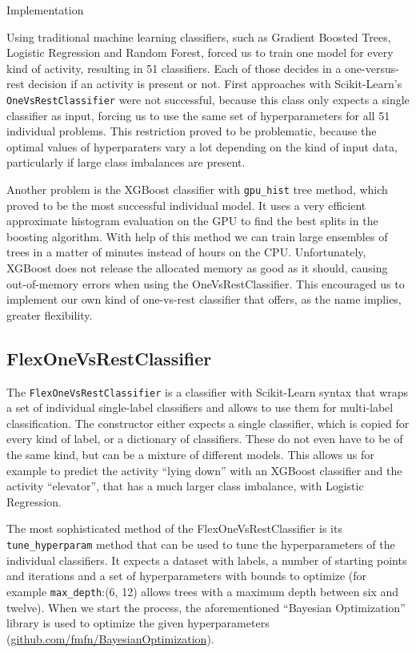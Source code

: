 \begin{section}{Implementation}



Using traditional machine learning classifiers, such as Gradient Boosted Trees, Logistic Regression and Random Forest, forced us to train one model for every kind of activity, resulting in 51 classifiers. Each of those decides in a one-versus-rest decision if an activity is present or not. 
First approaches with Scikit-Learn's \texttt{OneVsRestClassifier} were not successful, because this class only expects a single classifier as input, forcing us to use the same set of hyperparameters for all 51 individual problems. This restriction proved to be problematic, because the optimal values of hyperparaters vary a lot depending on the kind of input data, particularly if large class imbalances are present.

Another problem is the XGBoost classifier with \texttt{gpu\_hist} tree method, which proved to be the most successful individual model. It uses a very efficient approximate histogram evaluation on the GPU to find the best splits in the boosting algorithm. With help of this method we can train large ensembles of trees in a matter of minutes instead of hours on the CPU. Unfortunately, XGBoost does not release the allocated memory as good as it should, causing out-of-memory errors when using the OneVsRestClassifier.
This encouraged us to implement our own kind of one-vs-rest classifier that offers, as the name implies, greater flexibility. 

\subsection{FlexOneVsRestClassifier}

The \texttt{FlexOneVsRestClassifier} is a classifier with Scikit-Learn syntax that wraps a set of individual single-label classifiers and allows to use them for multi-label classification. The constructor either expects a single classifier, which is copied for every kind of label, or a dictionary of classifiers. These do not even have to be of the same kind, but can be a mixture of different models. This allows us for example to predict the activity \enquote{lying down} with an XGBoost classifier and the activity \enquote{elevator}, that has a much larger class imbalance, with Logistic Regression.

The most sophisticated method of the FlexOneVsRestClassifier is its \texttt{tune\_hyperparam} method that can be used to tune the hyperparameters of the individual classifiers. It expects a dataset with labels, a number of starting points and iterations and a set of hyperparameters with bounds to optimize (for example \texttt{max\_depth}:(6, 12) allows trees with a maximum depth between six and twelve). When we start the process, the aforementioned \enquote{Bayesian Optimization} library is used to optimize the given hyperparameters (\href{https://github.com/fmfn/BayesianOptimization}{github.com/fmfn/BayesianOptimization}). 


\end{section}
